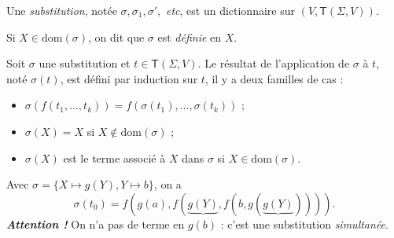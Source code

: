 \documentclass[../main]{subfiles}
\begin{document}
  \begin{defn}
    Une \textit{substitution}, notée $\sigma, \sigma_1, \sigma',$ \textit{etc}, est un dictionnaire sur $(V, \mathsf{T}(\Sigma, V))$.

    Si $X \in \mathrm{dom}(\sigma)$, on dit que $\sigma$ est \textit{définie} en $X$.

    Soit $\sigma$ une substitution et $t \in \mathsf{T}(\Sigma, V)$.
    Le résultat de l'application de $\sigma$ à $t$, noté $\sigma(t)$, est défini par induction sur $t$, il y a deux familles de cas :
    \begin{itemize}
      \item $\sigma(f(t_1, \ldots, t_k)) = f(\sigma(t_1), \ldots, \sigma(t_k))$ ;
      \item $\sigma(X) = X$ si  $X \not\in \mathrm{dom}(\sigma)$ ;
      \item $\sigma(X)$ est le terme associé à $X$ dans $\sigma$ si $X \in \mathrm{dom}(\sigma)$.
    \end{itemize}
  \end{defn}

  \begin{exm}
    Avec $\sigma = \{X \mapsto g(Y), Y \mapsto b\}$, on a \[
      \sigma(t_0) = f(g(a), f(\underbrace{g(Y)},f(b,g(\underbrace{g(Y)}))))
    .\] 
    \textit{\textbf{Attention !}} On n'a pas de terme en $g(b)$ : c'est une substitution \textit{simultanée}.
  \end{exm}
\end{document}
